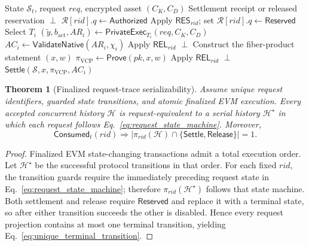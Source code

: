 \documentclass[10pt,journal,compsoc]{IEEEtran}
\newtheorem{theorem}{Theorem}
\begin{document}
\begin{algorithm}[!t]
\caption{Request Admission and Confidential Circulation}
\label{alg:circulation}
\begin{algorithmic}[1]
\REQUIRE State $\mathcal{S}_t$, request $req$, encrypted asset $(C_K,C_D)$
\ENSURE Settlement receipt or released reservation
    \RETURN $\perp$
\ENDIF
\STATE $\mathcal{R}[rid].q\leftarrow\mathsf{Authorized}$
\STATE Apply $\mathsf{RES}_{rid}$; set $\mathcal{R}[rid].q\leftarrow\mathsf{Reserved}$
\STATE Select $T_i$
\STATE $(\widetilde{y},b_{\mathrm{act}},AR_i)\leftarrow\mathsf{PrivateExec}_{T_i}(req,C_K,C_D)$
\STATE $AC_i\leftarrow\mathsf{ValidateNative}(AR_i,\chi_i)$
    \STATE Apply $\mathsf{REL}_{rid}$
    \RETURN $\perp$
\ENDIF
\STATE Construct the fiber-product statement $(x,w)$
\STATE $\pi_{\mathrm{VCP}}\leftarrow\mathsf{Prove}(pk,x,w)$
    \STATE Apply $\mathsf{REL}_{rid}$
    \RETURN $\perp$
\ENDIF
\RETURN $\mathsf{Settle}(\mathcal{S},x,\pi_{\mathrm{VCP}},AC_i)$
\end{algorithmic}
\end{algorithm}

\begin{theorem}[Finalized request-trace serializability]
\label{thm:request_trace_linearizability}
Assume unique request identifiers, guarded state transitions, and atomic finalized EVM execution. Every accepted concurrent history $\mathcal{H}$ is request-equivalent to a serial history $\mathcal{H}^{\star}$ in which each request follows Eq.~\eqref{eq:request_state_machine}. Moreover,
\begin{equation}
\mathsf{Consumed}_t(rid)\Longrightarrow
\left|\pi_{rid}(\mathcal{H})\cap
\{\mathsf{Settle},\mathsf{Release}\}\right|=1.
\label{eq:unique_terminal_transition}
\end{equation}
\end{theorem}

\begin{proof}
Finalized EVM state-changing transactions admit a total execution order. Let $\mathcal{H}^{\star}$ be the successful protocol transitions in that order. For each fixed $rid$, the transition guards require the immediately preceding request state in Eq.~\eqref{eq:request_state_machine}; therefore $\pi_{rid}(\mathcal{H}^{\star})$ follows that state machine. Both settlement and release require $\mathsf{Reserved}$ and replace it with a terminal state, so after either transition succeeds the other is disabled. Hence every request projection contains at most one terminal transition, yielding Eq.~\eqref{eq:unique_terminal_transition}.
\end{proof}
\end{document}
